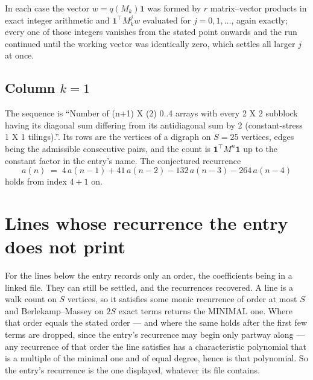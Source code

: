\documentclass[11pt,a4paper]{article}
\theoremstyle{plain}
\theoremstyle{definition}
\begin{document}
In each case the vector $w=q(M_k)\mathbf{1}$ was formed by $r$ matrix--vector products in
exact integer arithmetic and $\mathbf{1}^{\!\top}M_k^{j}w$ evaluated for $j=0,1,\dots$,
again exactly; every one of those integers vanishes from the stated point onwards and the run
continued until the working vector was identically zero, which settles all larger $j$ at once.

\subsection*{Column $k$$=1$}
The sequence is ``Number of (n+1) X (2) 0..4 arrays with every 2 X 2 subblock having its diagonal sum differing from its antidiagonal sum by 2 (constant-stress 1 X 1 tilings).''. Its rows are the vertices of a digraph on
$S=25$ vertices, edges being the admissible consecutive pairs, and the count is
$\mathbf{1}^{\!\top}M^{n}\mathbf{1}$ up to the constant factor in the entry's name.
The conjectured recurrence
\[
a(n)\;=\;4\,a(n-1) + 41\,a(n-2) - 132\,a(n-3) - 264\,a(n-4)
\]
holds from index $4+1$ on.


\section{Lines whose recurrence the entry does not print}

For the lines below the entry records only an order, the coefficients being in a linked file.
They can still be settled, and the recurrences recovered. A line is a walk count on $S$
vertices, so it satisfies some monic recurrence of order at most $S$ and Berlekamp--Massey on
$2S$ exact terms returns the MINIMAL one. Where that order equals the stated order --- and
where the same holds after the first few terms are dropped, since the entry's recurrence may
begin only partway along --- any recurrence of that order the line satisfies has a
characteristic polynomial that is a multiple of the minimal one and of equal degree, hence is
that polynomial. So the entry's recurrence is the one displayed, whatever its file contains.
\end{document}
